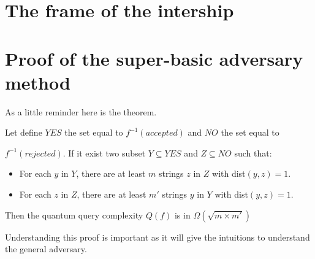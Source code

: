\begin{appendix}

    \section*{The frame of the intership}

    \section{Proof of the super-basic adversary method}\label{proof:advmethod}
    As a little reminder here is the theorem.
    \begin{theorem}
        Let define $YES$ the set equal to $f^{-1}(accepted)$ and $NO$ the set
        equal to

        $f^{-1}(rejected)$. If it exist two subset $Y\subseteq YES$ and
        $Z \subseteq NO$ such that:
        \begin{itemize}
            \item For each $y$ in $Y$, there are at least $m$ strings $z$ in $Z$ with dist$(y,z)=1$.
            \item For each $z$ in $Z$, there are at least $m'$ strings $y$ in $Y$ with dist$(y,z)=1$.
        \end{itemize}
        Then the quantum query complexity $Q(f)$ is in  $\Omega(\sqrt{m\times m'})$
    \end{theorem}

    Understanding this proof is important as it will give the intuitions to understand the
    general adversary.


\end{appendix}
